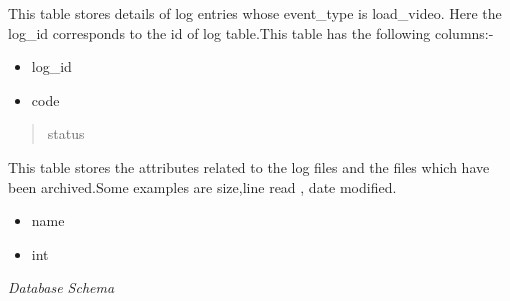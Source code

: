\documentclass[a4paper,12pt,oneside]{sphinxmanual}
\begin{document}
\begin{DUlineblock}{0em}
\item[] This table stores details of log entries whose event\_type is load\_video.  Here the log\_id corresponds  to the id of log table.This table has the following columns:-
\end{DUlineblock}
\begin{itemize}
\item {} 
log\_id

\item {} 
code

\end{itemize}
\begin{quote}\begin{description}
\item[{status}] \leavevmode
\end{description}\end{quote}

\begin{DUlineblock}{0em}
\item[] This table stores the attributes related to the log files and the files which have been archived.Some examples are size,line read , date modified.
\end{DUlineblock}
\begin{itemize}
\item {} 
name

\item {} 
int

\end{itemize}

\emph{Database Schema}
\begin{figure}[htbp]
\centering

\end{figure}
\end{document}
